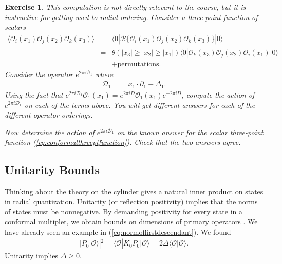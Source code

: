 \documentclass[11pt]{ws-rv9x6}
\newcommand\be{\begin{eqnarray}}
\newcommand\ee{\end{eqnarray}}
\newcommand\cO{\mathcal{O}}
\newcommand\ptl\partial
\newcommand\<\langle
\renewcommand\>\rangle
\newcommand\nn{\nonumber}
\renewcommand\.{\cdot}
\newcommand\De{\Delta}
\newtheorem{exercise}{Exercise}[section]
\begin{document}
\begin{exercise}
This computation is not directly relevant to the course, but it is instructive for getting used to radial ordering.  Consider a three-point function of scalars
\be
\<\cO_i(x_1)\cO_j(x_2)\cO_k(x_3)\> &=& \<0|\mathcal{R}\{\cO_i(x_1)\cO_j(x_2)\cO_k(x_3)\}|0\>\nn\\
&=&\theta(|x_3|\geq |x_2| \geq |x_1|)\<0|\cO_k(x_3)\cO_j(x_2)\cO_i(x_1)|0\>\nn\\
&&+\mathrm{permutations}.
\ee
Consider the operator $e^{2\pi i\mathcal{D}_1}$ where
\be
\mathcal{D}_1 &=& x_1\.\ptl_1+\De_1.
\ee
Using the fact that $e^{2\pi i\mathcal{D}_1}\cO_1(x_1)= e^{2\pi i D}\cO_1(x_1)e^{-2\pi i D}$, compute the action of $e^{2\pi i \mathcal{D}_1}$ on each of the terms above.  You will get different answers for each of the different operator orderings.

Now determine the action of $e^{2\pi i \mathcal{D}_1}$ on the known answer for the scalar three-point function (\ref{eq:conformalthreeptfunction}).  Check that the two answers agree.
\end{exercise}

\subsection{Unitarity Bounds}

Thinking about the theory on the cylinder gives a natural inner product on states in radial quantization.  Unitarity (or reflection positivity) implies that the norms of states must be nonnegative.  By demanding positivity for every state in a conformal multiplet, we obtain bounds on dimensions of primary operators \cite{Mack:1975je,Jantzen,Minwalla:1997ka}.  We have already seen an example in (\ref{eq:normoffirstdescendant}). We found
\be
|P_0|\cO\>|^2 = \<\cO|K_0 P_0|\cO\> = 2\De\<\cO|\cO\>.
\ee
Unitarity implies $\De\geq 0$.
\end{document}
